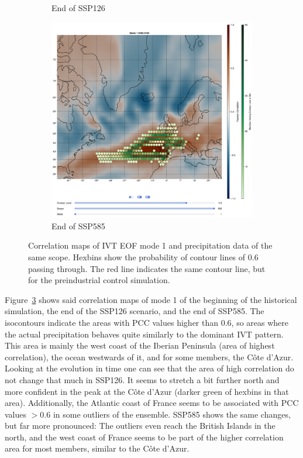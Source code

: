 \begin{figure}[!htb]
\begin{subfigure}[b]{0.32\textwidth}
    \caption{End of SSP126} 
    \label{fig:ivt eof pr cor ssp126 mode1}
  \end{subfigure}
  \begin{subfigure}[b]{0.32\textwidth}
    \includegraphics[width=\textwidth]{figures/ivt_pr_cor_mode1_ssp585_hexbin.png}
    \caption{End of SSP585}
    \label{fig:ivt eof pr cor ssp585 mode1}
  \end{subfigure}
  \caption{Correlation maps of IVT EOF mode 1 and precipitation data of the same scope. Hexbins show the probability of contour lines of $0.6$ passing through. The red line indicates the same contour line, but for the preindustrial control simulation.}
  \label{fig:ivt eof pr cor mode1}
\end{figure}


Figure~\ref{fig:ivt eof pr cor mode1} shows said correlation maps of mode 1 of the beginning of the historical simulation, the end of the SSP126 scenario, and the end of SSP585. 
The isocontours indicate the areas with PCC values higher than $0.6$, so areas where the actual precipitation behaves quite similarly to the dominant IVT pattern. 
This area is mainly the west coast of the Iberian Peninsula (area of highest correlation), the ocean westwards of it, and for some members, the Côte d'Azur. 
Looking at the evolution in time one can see that the area of high correlation do not change that much in SSP126. 
It seems to stretch a bit further north and more confident in the peak at the Côte d'Azur (darker green of hexbins in that area). 
Additionally, the Atlantic coast of France seems to be associated with PCC values $>0.6$ in some outliers of the ensemble. 
SSP585 shows the same changes, but far more pronounced: The outliers even reach the British Islands in the north, and the west coast of France seems to be part of the higher correlation area for most members, similar to the Côte d'Azur.

